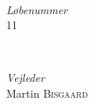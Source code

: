 	\HRule\\[1.5cm]






	\begin{minipage}{0.4\textwidth}
		\begin{flushleft}
			\large
			\textit{Løbenummer}\\
			11\\
		\end{flushleft}
	\end{minipage}
	~
	\begin{minipage}{0.4\textwidth}
		\begin{flushright}
			\large
			\textit{Vejleder}\\
			Martin \textsc{Bisgaard} %
		\end{flushright}
	\end{minipage}

